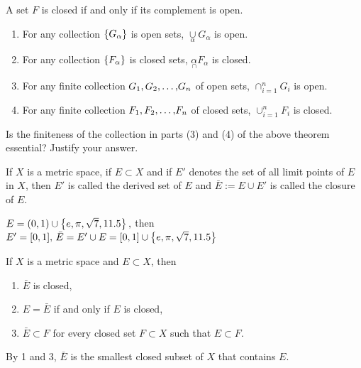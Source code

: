 \documentclass[../main-sheet.tex]{subfiles}
\begin{document}
\begin{cor}
    A set $ F $ is closed if and only if its complement is open.
\end{cor}
\begin{thm}\hfill
    \begin{enumerate}
        \item For any collection $ \left\{G_\alpha\right\} $ is open sets, $ \underset{\alpha}{\cup} G_\alpha$ is open.
        \item For any collection $ \left\{F_\alpha\right\} $ is closed sets, $ \underset{\cap}{\alpha} F_\alpha$ is closed.
        \item For any finite collection $ {G}_1{,}\,{G}_2{,}\dots{,}{G}_n $ of open sets, $ \cap_{i=1}^{n} G_i $ is open.
        \item For any finite collection $ {F}_1{,}\,{F}_2{,}\dots{,}{F}_n $ of closed sets, $ \cup_{i=1}^{n} F_i $ is closed.
    \end{enumerate}
\end{thm}
\begin{note}
    Is the finiteness of the collection in parts (3) and (4) of the above theorem essential? Justify your answer.
\end{note}
\begin{defn}
    If $ X $ is a metric space, if $ E\subset X $ and if $ E' $ denotes the set of all limit points of $ E $ in $ X $, then $ E' $ is called the derived set of $ E $ and $ \bar{E}:=E\cup E' $ is called the closure of $ E $.
\end{defn}
\begin{ex}
    $ E=(0,1)\cup \left\{e,\pi,\sqrt{7},11.5\right\}, $ then $ E'=[0,1],\, \bar{E}=E'\cup E=[0,1]\cup  \left\{e,\pi,\sqrt{7},11.5\right\}$
\end{ex}
\begin{thm}
    If $ X $ is a metric space and $ E\subset X $, then 
    \begin{enumerate}[label=(\alph*)]
        \item $ \bar{E} $ is closed,
        \item $ E=\bar{E} $ if and only if $ E $ is closed,
        \item $ \bar{E}\subset F $ for every closed set $ F\subset X $ such that $ E\subset F $.
    \end{enumerate}
\end{thm}
By 1 and 3, $ \bar{E} $ is the smallest closed subset of $ X $ that contains $ E $.
\end{document}
